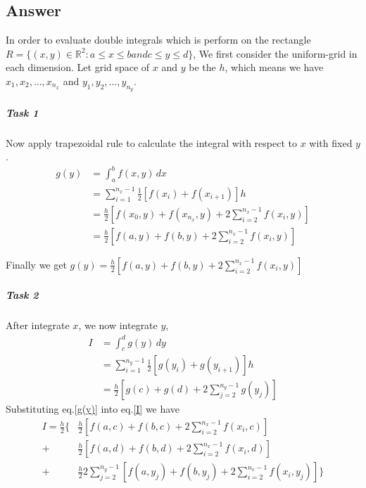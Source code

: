 \documentclass[
	12pt, %
]{fphw}
\numberwithin{equation}{section}
\numberwithin{figure}{section}
\numberwithin{table}{section}
\begin{document}
\subsection*{Answer}

In order to evaluate double integrals which is perform on the rectangle $R = \{ (x, y) \in \mathbb{R}^2: a \leq x \leq b and c \leq y \leq d  \} $, We first consider the uniform-grid in each
dimension. Let grid space of $x$ and $y$ be the $h$, which means we have $x_1, x_2, \ldots , x_{n_x}$ and $y_1, y_2, \ldots , y_{n_y}$.

\subparagraph*{Task 1}
Now  apply trapezoidal rule to calculate the integral with respect to $x$ with fixed $y$.
\begin{equation} \label{g(y)}
	\begin{aligned}
		g(y) & = \int^{b}_{a}f(x,y)\,dx                                                 \\
		     & = \sum^{n_x-1}_{i=1}\frac{1}{2}[f(x_i)+f(x_{i+1})]h                      \\
		     & = \frac{h}{2} [f(x_0, y) + f(x_{n_x}, y) + 2\sum^{n_x-1}_{i=2}f(x_i, y)] \\
		     & = \frac{h}{2} [f(a, y) + f(b, y) + 2\sum^{n_x-1}_{i=2}f(x_i, y)]
	\end{aligned}
\end{equation}

Finally we get $g(y)=\frac{h}{2} [f(a, y) + f(b, y) + 2\sum^{n_x-1}_{i=2}f(x_i, y)]$

\subparagraph*{Task 2}
After integrate $x$, we now integrate $y$,
\begin{equation} \label{I}
	\begin{aligned}
		I & = \int^{d}_{c}g(y)\,dy                                  \\
		  & = \sum^{n_y-1}_{i=1}\frac{1}{2} [g(y_i)+g(y_{i+1})]h    \\
		  & = \frac{h}{2} [g(c) + g(d) + 2\sum^{n_y-1}_{j=2}g(y_j)]
	\end{aligned}
\end{equation}
Substituting eq.\eqref{g(y)} into  eq.\eqref{I} we have
\begin{equation}
	\begin{aligned} \label{substitutedI}
		I = \frac{h}{2}\{ & \frac{h}{2}[f(a, c) + f(b, c) + 2\sum^{n_x-1}_{i=2}f(x_i, c)]                            \\
		+                 & \frac{h}{2}[f(a, d) + f(b, d) + 2\sum^{n_x-1}_{i=2}f(x_i, d)]                            \\
		+                 & \frac{h}{2}2\sum^{n_y-1}_{j=2}[f(a, y_j) + f(b, y_j) + 2\sum^{n_x-1}_{i=2}f(x_i, y_j)]\}
	\end{aligned}
\end{equation}
\end{document}
